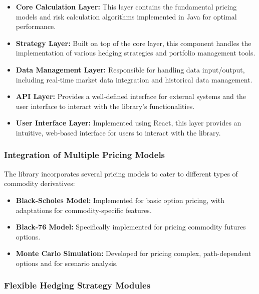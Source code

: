 \documentclass[12pt]{article}
\begin{document}
\begin{itemize}
\item \textbf{Core Calculation Layer:} This layer contains the fundamental pricing models and risk calculation algorithms implemented in Java for optimal performance.



\item \textbf{Strategy Layer:} Built on top of the core layer, this component handles the implementation of various hedging strategies and portfolio management tools.

\item \textbf{Data Management Layer:} Responsible for handling data input/output, including real-time market data integration and historical data management.

\item \textbf{API Layer:} Provides a well-defined interface for external systems and the user interface to interact with the library's functionalities.

\item \textbf{User Interface Layer:} Implemented using React, this layer provides an intuitive, web-based interface for users to interact with the library.
\end{itemize}

\subsubsection{Integration of Multiple Pricing Models}

The library incorporates several pricing models to cater to different types of commodity derivatives:

\begin{itemize}
\item \textbf{Black-Scholes Model:} Implemented for basic option pricing, with adaptations for commodity-specific features.

\item \textbf{Black-76 Model:} Specifically implemented for pricing commodity futures options.

\item \textbf{Monte Carlo Simulation:} Developed for pricing complex, path-dependent options and for scenario analysis.

\end{itemize}

\subsubsection{Flexible Hedging Strategy Modules}
\end{document}
